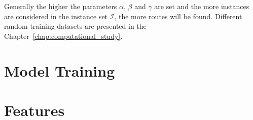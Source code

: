 Generally the higher the parameters $\alpha$, $\beta$ and $\gamma$ are set and the more instances
are considered in the instance set $\mathcal{I}$, the more routes will be found. Different
random training datasets are presented in the Chapter~\ref{chap:computational_study}.



\section{Model Training}
\label{sec:ModelTraining}

\section{Features}
\label{sec:Features}
